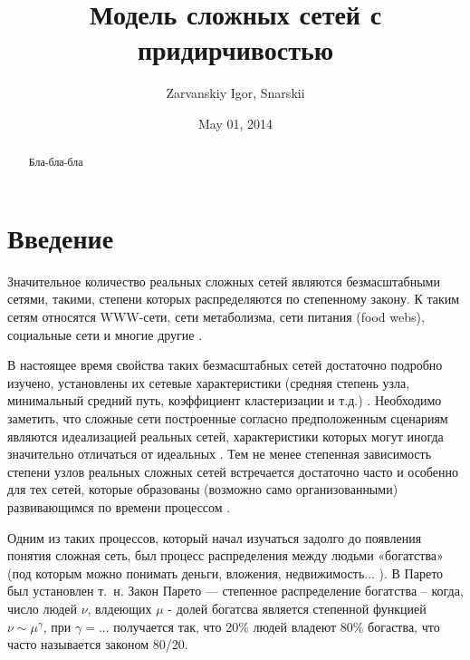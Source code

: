 \documentclass[10pt,aps,pra]{revtex4-1}
\begin{document}
\title{Модель сложных сетей с придирчивостью}
\author{Zarvanskiy Igor, Snarskii}


\date{May 01, 2014}

\begin{abstract}
Бла-бла-бла
\end{abstract}
\maketitle

\section{Введение}

Значительное количество реальных сложных сетей являются безмасштабными сетями, такими, степени которых распределяются по степенному закону. К таким сетям относятся WWW-сети, сети метаболизма, сети питания (food webs), социальные сети и многие другие \cite{Dor2}.

В настоящее время свойства таких безмасштабных сетей достаточно подробно изучено, установлены их сетевые характеристики (средняя степень узла, минимальный средний путь, коэффициент кластеризации и т.д.) \cite{Newman}. Необходимо заметить, что сложные сети построенные согласно предположенным сценариям \cite{AlBa2} являются идеализацией реальных сетей, характеристики которых могут иногда значительно отличаться от идеальных \cite{Newman}. Тем не менее степенная зависимость степени узлов реальных сложных сетей встречается достаточно часто и особенно для тех сетей, которые образованы (возможно само организованными) развивающимся по времени процессом \cite{}.

Одним из таких процессов, который начал изучаться задолго до появления понятия сложная сеть, был процесс распределения между людьми «богатства» (под которым можно понимать деньги, вложения, недвижимость... ). В \cite{Pareto} Парето был установлен т. н. Закон Парето — степенное распределение богатства – когда, число людей $\nu$, влдеющих $\mu$ - долей богатсва является степенной функцией $\nu \sim \mu^\gamma$, при $\gamma=...$ получается так, что 20\% людей владеют 80\% богаства, что часто называется законом 80/20. 
\end{document}
